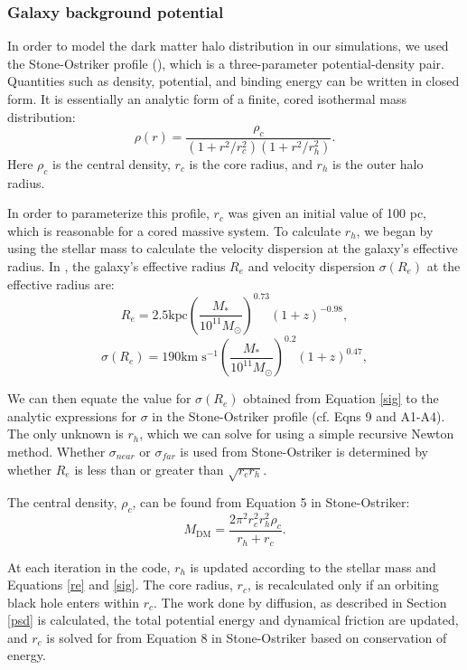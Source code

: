 \documentclass[fleqn,usenatbib,useAMS]{mnras}
\begin{document}
\subsubsection{Galaxy background potential} \label{Galaxy background potential}
In order to model the dark matter halo distribution in our simulations, we used the Stone-Ostriker profile (\citet{2015ApJ...806L..28S}), which is a three-parameter potential-density pair.  Quantities such as density, potential, and binding energy can be written in closed form.  It is essentially an analytic form of a finite, cored isothermal mass distribution:
\begin{equation} \label{jerry}
\rho(r) = \frac{\rho_c}{(1+r^2/r_{c}^2)(1+r^2/r_{h}^2)}.
\end{equation}
Here $\rho_c$ is the central density, $r_c$ is the core radius, and $r_h$ is the outer halo radius.

In order to parameterize this profile, $r_c$ was given an initial value of 100 pc, which is reasonable for a cored massive system.  To calculate $r_h$, we began by using the stellar mass to calculate the velocity dispersion at the galaxy's effective radius.  In \citet{2014ApJ...789..156M}, the galaxy's effective radius $R_{e}$ and velocity dispersion $\sigma(R_e)$ at the effective radius are:
\begin{equation} \label{re}
R_{e} = 2.5 \mathrm{kpc}\left(\frac{M_*}{10^{11}M_{\odot}}\right)^{0.73}(1+z)^{-0.98},
\end{equation}
\begin{equation} \label{sig}
\sigma(R_{e}) = 190\mathrm{km}\;\mathrm{s}^{-1}\left(\frac{M_{*}}{10^{11}M_{\odot}}\right)^{0.2}(1+z)^{0.47},
\end{equation}

We can then equate the value for $\sigma({R_e})$ obtained from Equation \ref{sig} to the analytic expressions for $\sigma$ in the Stone-Ostriker profile (cf. Eqns 9 and A1-A4).  The only unknown is $r_h$, which we can solve for using a simple recursive Newton method.  Whether $\sigma_{near}$ or $\sigma_{far}$ is used from Stone-Ostriker is determined by whether $R_e$ is less than or greater than $\sqrt{r_c r_h}$.

The central density, $\rho_c$, can be found from Equation 5 in Stone-Ostriker:
\begin{equation} \label{rhoc}
M_\mathrm{DM} = \frac{2\pi^2r_{c}^2r_{h}^2\rho_c}{r_h+r_c}.
\end{equation}

At each iteration in the code, $r_h$ is updated according to the stellar mass and Equations \ref{re} and \ref{sig}.  The core radius, $r_c$, is recalculated only if an orbiting black hole enters within $r_c$.  The work done by diffusion, as described in Section \ref{psd} is calculated, the total potential energy and dynamical friction are updated, and $r_c$ is solved for from Equation 8 in Stone-Ostriker based on conservation of energy.
\end{document}
